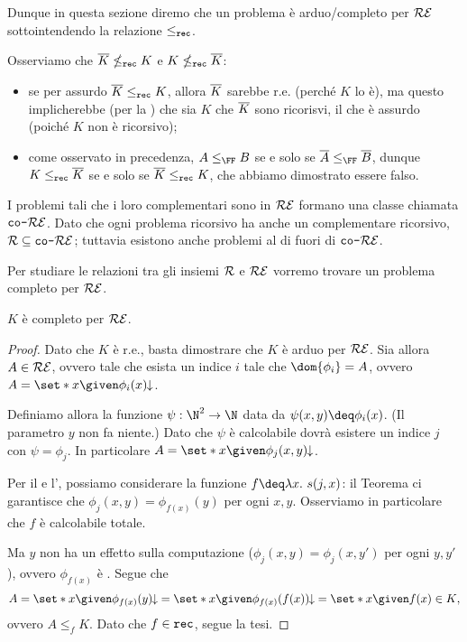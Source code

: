 Dunque in questa sezione diremo che un problema è arduo/completo per $\mathcal{RE}$ sottointendendo la relazione $\leq_{\texttt{rec}}$.   

\begin{remark} 
    Osserviamo che $\overline{K} \nleq_{\texttt{rec}} K$ e $K \nleq_{\texttt{rec}} \overline{K}$: \begin{itemize}
        \item se per assurdo $\overline{K} \leq_{\texttt{rec}} K$, allora $\overline{K}$ sarebbe r.e. (perché $K$ lo è), ma questo implicherebbe (per la ) che sia $K$ che $\overline{K}$ sono ricorisvi, il che è assurdo (poiché $K$ non è ricorsivo);
        \item come osservato in precedenza, $A \leq_{\FF} B$ se e solo se $\compl{A} \leq_{\FF} \compl{B}$, dunque $K \leq_{\texttt{rec}} \overline{K}$ se e solo se $\overline{K} \leq_{\texttt{rec}} K$, che abbiamo dimostrato essere falso.   
    \end{itemize}  
\end{remark}

I problemi tali che i loro complementari sono in $\mathcal{RE}$ formano una classe chiamata $\texttt{co-}\mathcal{RE}$. Dato che ogni problema ricorsivo ha anche un complementare ricorsivo, $\mathcal{R} \subseteq \texttt{co-}\mathcal{RE}$; tuttavia esistono anche problemi al di fuori di $\texttt{co-}\mathcal{RE}$.   

\medskip

Per studiare le relazioni tra gli insiemi $\mathcal{R}$ e $\mathcal{RE}$ vorremo trovare un problema completo per $\mathcal{RE}$.

\begin{theorem}
    {}{}
    $K$ è completo per $\mathcal{RE}$. 
\end{theorem}
\begin{proof}
    Dato che $K$ è r.e., basta dimostrare che $K$ è arduo per $\mathcal{RE}$. Sia allora $A \in \mathcal{RE}$, ovvero tale che esista un indice $i$ tale che $\dom{\phi_i} = A$, ovvero $A = \set*{x \given \phi_i(x)\conv}$.
    
    Definiamo allora la funzione $\psi : \N^2 \to \N$ data da $\psi(x, y) \deq \phi_i(x)$. (Il parametro $y$ non fa niente.)
    Dato che $\psi$ è calcolabile dovrà esistere un indice $j$ con $\psi = \phi_j$. In particolare $A = \set*{x \given \phi_j(x, y)\conv}$.
    
    Per il  e l', possiamo considerare la funzione $f \deq \lam{x}{s(j, x)}$: il Teorema ci garantisce che $\phi_j(x, y) = \phi_{f(x)}(y)$ per ogni $x, y$. Osserviamo in particolare che $f$ è calcolabile totale.

    Ma $y$ non ha un effetto sulla computazione ($\phi_j(x, y) = \phi_j(x, y')$ per ogni $y, y'$), ovvero $\phi_{f(x)}$ è . Segue che \[
        A = \set*{x \given \phi_{f(x)}(y)\conv} = \set*{x \given \phi_{f(x)}(f(x))\conv} = \set*{x \given f(x) \in K},
    \] ovvero $A \leq_f K$. Dato che $f \in \texttt{rec}$, segue la tesi.
\end{proof}

